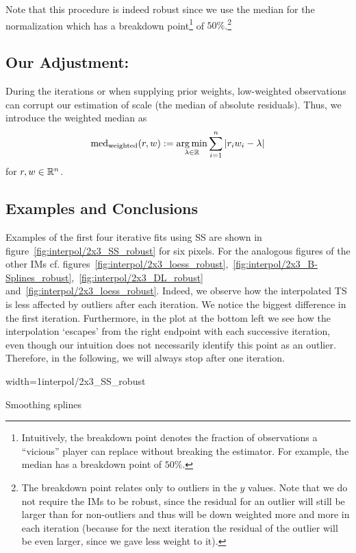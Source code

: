 {	Note that this procedure is indeed robust since we use the median for the normalization which has a breakdown point\footnote{Intuitively, the breakdown point denotes the fraction of observations a ``vicious'' player can replace without breaking the estimator. For example, the median has a breakdown point of $50 \%$.} of $50 \%$.\footnote{The breakdown point relates only to outliers in the $y$ values. Note that we do not require the {{IM}}s to be robust, since the residual for an outlier will  still be larger than for non-outliers and thus will be down weighted more and more in each iteration (because for the next iteration the residual of the outlier will be even larger, since we gave less weight to it).}
	\subsection{Our Adjustment:}{
		During the iterations or when supplying prior weights, low-weighted observations can corrupt our estimation of scale (the median of absolute residuals). Thus, we introduce the weighted median as
		$$
			\operatorname{med}_\text{weighted}(r,w) := \operatorname*{arg\, min}_{\lambda \in \mathbb{R}} \sum_{i=1}^n |r_iw_i -\lambda|
		$$
		for $r,w\in \mathbb{R}^n$. 
	}
	\subsection{Examples and Conclusions}{		
		Examples of the first four iterative fits using SS are shown in figure~\ref{fig:interpol/2x3_SS_robust} for six pixels. For the analogous figures of the other {{IM}}s cf. figures~\ref{fig:interpol/2x3_loess_robust},~\ref{fig:interpol/2x3_B-Splines_robust},~\ref{fig:interpol/2x3_DL_robust} and~\ref{fig:interpol/2x3_loess_robust}.
		Indeed, we observe how the interpolated {TS} is less affected by outliers after each iteration. We notice the biggest difference in the first iteration. Furthermore, in the plot at the bottom left we see how the interpolation `escapes' from the right endpoint with each successive iteration, even though our intuition does not necessarily identify this point as an outlier. Therefore, in the following, we will always stop after one iteration.

		\begin{my_figure}[h]{width=1\textwidth}{interpol/2x3_SS_robust}
			\caption[Smoothing splines robustification.]{Smoothing splines \RobItPlot}
			\label{fig:interpol/2x3_SS_robust}
		\end{my_figure}
	} 
	
}
